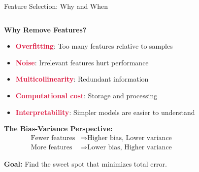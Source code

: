 \documentclass[aspectratio=169,11pt]{beamer}
\begin{document}
\begin{frame}{Feature Selection: Why and When}
\begin{columns}
\begin{column}{0.5\textwidth}
\textbf{Why Remove Features?}

\begin{itemize}
\item \textcolor{crimson}{\textbf{Overfitting}}: Too many features relative to samples
\item \textcolor{crimson}{\textbf{Noise}}: Irrelevant features hurt performance
\item \textcolor{crimson}{\textbf{Multicollinearity}}: Redundant information
\item \textcolor{crimson}{\textbf{Computational cost}}: Storage and processing
\item \textcolor{crimson}{\textbf{Interpretability}}: Simpler models are easier to understand
\end{itemize}

\vspace{0.3cm}
\textbf{The Bias-Variance Perspective:}
\begin{align}
\text{Fewer features} &\Rightarrow \text{Higher bias, Lower variance}\\
\text{More features} &\Rightarrow \text{Lower bias, Higher variance}
\end{align}

\textbf{Goal:} Find the sweet spot that minimizes total error.
\end{column}
\begin{column}{0.5\textwidth}
\begin{figure}
\centering
{}
\end{figure}


\end{column}
\end{columns}
\end{frame}
\end{document}
